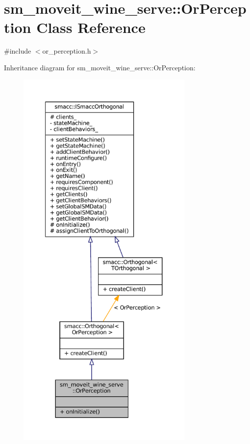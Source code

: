 \hypertarget{classsm__moveit__wine__serve_1_1OrPerception}{}\section{sm\+\_\+moveit\+\_\+wine\+\_\+serve\+:\+:Or\+Perception Class Reference}
\label{classsm__moveit__wine__serve_1_1OrPerception}


{\ttfamily \#include $<$or\+\_\+perception.\+h$>$}



Inheritance diagram for sm\+\_\+moveit\+\_\+wine\+\_\+serve\+:\+:Or\+Perception\+:
\nopagebreak
\begin{figure}[H]
\begin{center}
\leavevmode
\includegraphics[height=550pt]{classsm__moveit__wine__serve_1_1OrPerception__inherit__graph}
\end{center}
\end{figure}


